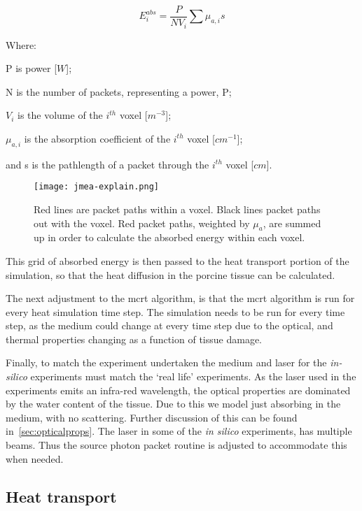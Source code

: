 \begin{equation}
E_{i}^{abs} = \frac{P}{N V_i}\sum\mu_{a,i} s
\label{eqn:Eabs}
\end{equation}

\noindent Where:

	\indent P is power [$W$];
	
	\indent N is the number of packets, representing a power, P;
	
	\indent $V_i$ is the volume of the $i^{th}$ voxel [$m^{-3}$];
	
	\indent $\mu_{a,i}$ is the absorption coefficient of the $i^{th}$ voxel [$cm^{-1}$];
	
	\indent and s is the pathlength of a packet through the $i^{th}$ voxel [$cm$].
	
	\medskip
	
\begin{figure}[!ht]
\centering
\texttt{[image: jmea-explain.png]}
\caption{Red lines are packet paths within a voxel. Black lines packet paths out with the voxel. Red packet paths, weighted by $\mu_a$, are summed up in order to calculate the absorbed energy within each voxel.}
\label{fig:jmea-explain}
\end{figure}	
		
This grid of absorbed energy is then passed to the heat transport portion of the simulation, so that the heat diffusion in the porcine tissue can be calculated.

The next adjustment to the \gls{mcrt} algorithm, is that the \gls{mcrt} algorithm is run for every heat simulation time step. The simulation needs to be run for every time step, as the medium could change at every time step due to the optical, and thermal properties changing as a function of tissue damage.

Finally, to match the experiment undertaken the medium and laser for the \textit{in-silico} experiments must match the `real life' experiments. As the laser used in the experiments emits an infra-red wavelength, the optical properties are dominated by the water content of the tissue. Due to this we model just absorbing in the medium, with no scattering. Further discussion of this can be found in~\cref{sec:opticalprops}. The laser in some of the \textit{in silico} experiments, has multiple beams. Thus the source photon packet routine is adjusted to accommodate this when needed.

\subsection{Heat transport}

